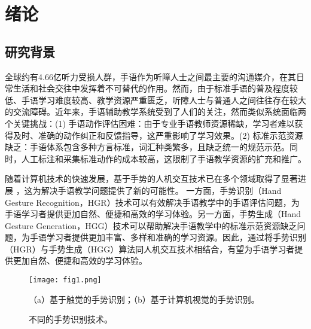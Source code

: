 
\chapter{绪论}
\label{sec:intro}

\section{研究背景}
全球约有4.66亿听力受损人群，手语作为听障人士之间最主要的沟通媒介，在其日常生活和社会交往中发挥着不可替代的作用。然而，由于标准手语的普及程度较低、手语学习难度较高、教学资源严重匮乏，听障人士与普通人之间往往存在较大的交流障碍。近年来，手语辅助教学系统受到了人们的关注，然而类似系统面临两个关键挑战：(1) 手语动作评估困难：由于专业手语教师资源稀缺，学习者难以获得及时、准确的动作纠正和反馈指导，这严重影响了学习效果。(2) 标准示范资源缺乏：手语体系包含多种方言标准，词汇种类繁多，且缺乏统一的规范示范。同时，人工标注和采集标准动作的成本较高，这限制了手语教学资源的扩充和推广。

随着计算机技术的快速发展，基于手势的人机交互技术已在多个领域取得了显著进展 \cite{伍杰2019基于视觉的实时手势识别方法研究, desai2017human,strickland2013using}，这为解决手语教学问题提供了新的可能性。
一方面，手势识别（Hand Gesture Recognition，HGR）技术可以有效解决手语教学中的手语评估问题，为手语学习者提供更加自然、便捷和高效的学习体验。另一方面，手势生成（Hand Gesture Generation，HGG）技术可以帮助解决手语教学中的标准示范资源缺乏问题，为手语学习者提供更加丰富、多样和准确的学习资源。因此，通过将手势识别（HGR）与手势生成（HGG）算法同人机交互技术相结合，有望为手语学习者提供更加自然、便捷和高效的学习体验。

\begin{figure}
  \centering
  \texttt{[image: fig1.png]}
  \caption*{（a）基于触觉的手势识别\cite{kevin2004}；（b）基于计算机视觉的手势识别\cite{iisuSDK2012}。}
  \caption{不同的手势识别技术。}
  \label{fig:gesture_techniques}
\end{figure}

